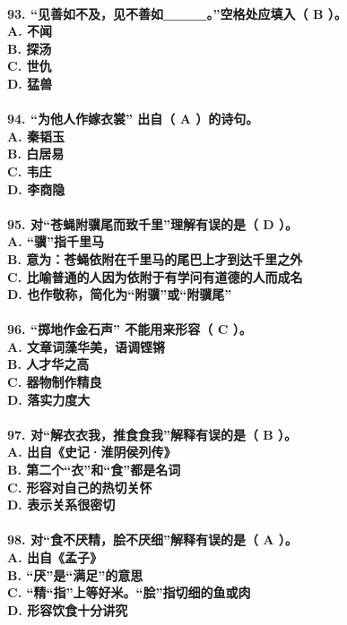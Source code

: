 \documentclass[UTF8]{ctexart} %
\begin{document}
\paragraph{
93. “见善如不及，见不善如\_\_\_\_。”空格处应填入（ \color{red}B\color{black} ）。 \\
    A. 不闻 \\
    B. 探汤 \\
    C. 世仇 \\
    D. 猛兽
}
\paragraph{
94. “为他人作嫁衣裳” 出自（ \color{red}A\color{black} ）的诗句。 \\
    A. 秦韬玉 \\
    B. 白居易 \\
    C. 韦庄 \\
    D. 李商隐
}
\paragraph{
95. 对“苍蝇附骥尾而致千里”理解有误的是（ \color{red}D\color{black} ）。 \\
    A. “骥”指千里马 \\
    B. 意为：苍蝇依附在千里马的尾巴上才到达千里之外 \\
    C. 比喻普通的人因为依附于有学问有道德的人而成名 \\
    D. 也作敬称，简化为“附骥”或“附骥尾”
}
\paragraph{
96. “掷地作金石声” 不能用来形容（ \color{red}C\color{black} ）。 \\
    A. 文章词藻华美，语调铿锵 \\
    B. 人才华之高 \\
    C. 器物制作精良 \\
    D. 落实力度大
}
\paragraph{
97. 对“解衣衣我，推食食我”解释有误的是（ \color{red}B\color{black} ）。 \\
    A. 出自《史记·淮阴侯列传》 \\
    B. 第二个“衣”和“食”都是名词 \\
    C. 形容对自己的热切关怀 \\
    D. 表示关系很密切
}
\paragraph{
98. 对“食不厌精，脍不厌细”解释有误的是（ \color{red}A\color{black} ）。 \\
    A. 出自《孟子》 \\
    B. “厌”是“满足”的意思 \\
    C. “精“指”上等好米。“脍”指切细的鱼或肉 \\
    D. 形容饮食十分讲究
}
\end{document}
